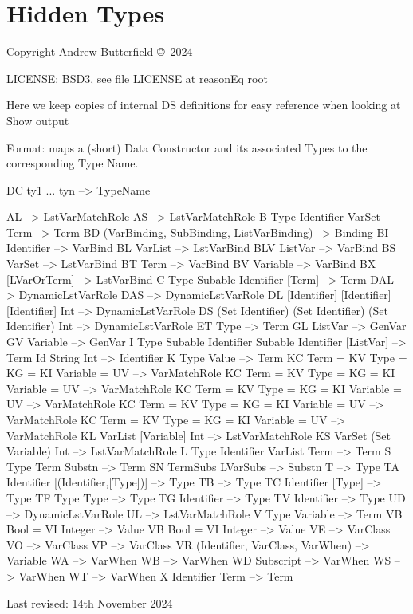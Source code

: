 \chapter{Hidden Types}

Copyright  Andrew Butterfield \copyright\ 2024

LICENSE: BSD3, see file LICENSE at reasonEq root


Here we keep copies of internal DS definitions
for easy reference when looking at \h{Show} output
\newpage

Format: maps a (short) Data Constructor and its associated Types to the corresponding Type Name.
\begin{code}
DC ty1 ... tyn -->  TypeName
\end{code}


\begin{code}
AL  -->  LstVarMatchRole
AS  -->  LstVarMatchRole
B Type Identifier VarSet Term  -->  Term
BD (VarBinding, SubBinding, ListVarBinding)  -->  Binding
BI Identifier  -->  VarBind
BL  VarList  -->  LstVarBind
BLV ListVar   -->  VarBind
BS  VarSet  -->  LstVarBind
BT Term  -->  VarBind
BV Variable   -->  VarBind
BX  [LVarOrTerm]   -->  LstVarBind
C Type Subable Identifier [Term]  -->  Term
DAL  -->  DynamicLstVarRole
DAS  -->  DynamicLstVarRole
DL [Identifier] [Identifier] [Identifier] Int  -->  DynamicLstVarRole
DS (Set Identifier) (Set Identifier) (Set Identifier) Int --> DynamicLstVarRole
ET Type   -->  Term
GL ListVar   -->  GenVar
GV Variable -->  GenVar
I Type Subable Identifier Subable Identifier [ListVar]  -->  Term
Id String Int  --> Identifier
K Type Value  -->  Term
KC Term = KV Type = KG = KI Variable = UV   -->  VarMatchRole
KC Term = KV Type = KG = KI Variable = UV   -->  VarMatchRole
KC Term = KV Type = KG = KI Variable = UV   -->  VarMatchRole
KC Term = KV Type = KG = KI Variable = UV   -->  VarMatchRole
KC Term = KV Type = KG = KI Variable = UV   -->  VarMatchRole
KL VarList [Variable] Int  -->  LstVarMatchRole
KS VarSet (Set Variable) Int  -->  LstVarMatchRole
L Type Identifier VarList Term  -->  Term
S Type Term Substn -->  Term
SN TermSubs LVarSubs   -->  Substn
T  -->  Type
TA Identifier [(Identifier,[Type])]  -->  Type
TB   -->  Type
TC Identifier [Type]  -->  Type
TF Type Type  -->  Type
TG Identifier -->  Type
TV Identifier  -->  Type
UD   -->  DynamicLstVarRole
UL   -->  LstVarMatchRole
V Type Variable  -->  Term
VB Bool = VI Integer   -->  Value
VB Bool = VI Integer   -->  Value
VE  -->  VarClass
VO  -->  VarClass
VP   -->  VarClass
VR (Identifier, VarClass, VarWhen)  -->  Variable
WA  -->  VarWhen
WB  -->  VarWhen
WD Subscript  -->  VarWhen
WS  -->  VarWhen
WT   -->  VarWhen
X Identifier Term  -->  Term
\end{code}
Last revised: 14th November 2024